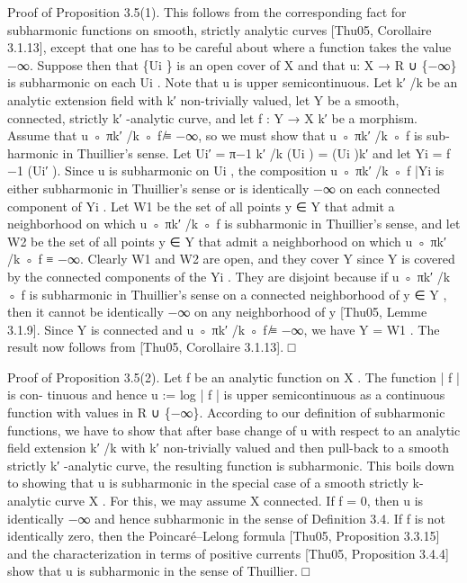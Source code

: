 \documentclass[
  10pt,
]{article}
\newenvironment{Shaded}{}{}
\newcommand{\NormalTok}[1]{#1}
\begin{document}
\begin{Shaded}
\begin{Highlighting}[]
\NormalTok{Proof of Proposition 3.5(1). This follows from the corresponding fact for subharmonic}
\NormalTok{functions on smooth, strictly analytic curves [Thu05, Corollaire 3.1.13], except that one}
\NormalTok{has to be careful about where a function takes the value −∞. Suppose then that \{Ui \}}
\NormalTok{is an open cover of X and that u: X → R ∪ \{−∞\} is subharmonic on each Ui . Note that}
\NormalTok{u is upper semicontinuous. Let k′ /k be an analytic extension field with k′ non{-}trivially}
\NormalTok{valued, let Y be a smooth, connected, strictly k′ {-}analytic curve, and let f : Y → X k′ be a}
\NormalTok{morphism. Assume that u ◦ πk′ /k ◦ f ̸≡ −∞, so we must show that u ◦ πk′ /k ◦ f is sub{-}}
\NormalTok{harmonic in Thuillier’s sense. Let Ui′ = π−1 k′ /k}
\NormalTok{                                                   (Ui ) = (Ui )k′ and let Yi = f −1 (Ui′ ). Since u}
\NormalTok{is subharmonic on Ui , the composition u ◦ πk′ /k ◦ f |Yi is either subharmonic in Thuillier’s}
\NormalTok{sense or is identically −∞ on each connected component of Yi .}
\NormalTok{   Let W1 be the set of all points y ∈ Y that admit a neighborhood on which u ◦ πk′ /k ◦ f}
\NormalTok{is subharmonic in Thuillier’s sense, and let W2 be the set of all points y ∈ Y that admit a}
\NormalTok{neighborhood on which u ◦ πk′ /k ◦ f ≡ −∞. Clearly W1 and W2 are open, and they cover}
\NormalTok{Y since Y is covered by the connected components of the Yi . They are disjoint because if}
\NormalTok{u ◦ πk′ /k ◦ f is subharmonic in Thuillier’s sense on a connected neighborhood of y ∈ Y ,}
\NormalTok{then it cannot be identically −∞ on any neighborhood of y [Thu05, Lemme 3.1.9].}
\NormalTok{Since Y is connected and u ◦ πk′ /k ◦ f ̸≡ −∞, we have Y = W1 . The result now follows}
\NormalTok{from [Thu05, Corollaire 3.1.13].                                                                  □}


\NormalTok{Proof of Proposition 3.5(2). Let f be an analytic function on X . The function | f | is con{-}}
\NormalTok{tinuous and hence u := log | f | is upper semicontinuous as a continuous function with}
\NormalTok{values in R ∪ \{−∞\}. According to our definition of subharmonic functions, we have to}
\NormalTok{show that after base change of u with respect to an analytic field extension k′ /k with k′}
\NormalTok{non{-}trivially valued and then pull{-}back to a smooth strictly k′ {-}analytic curve, the resulting}
\NormalTok{function is subharmonic. This boils down to showing that u is subharmonic in the special}
\NormalTok{case of a smooth strictly k{-}analytic curve X . For this, we may assume X connected. If}
\NormalTok{f = 0, then u is identically −∞ and hence subharmonic in the sense of Definition 3.4. If}
\NormalTok{f is not identically zero, then the Poincaré–Lelong formula [Thu05, Proposition 3.3.15]}
\NormalTok{and the characterization in terms of positive currents [Thu05, Proposition 3.4.4] show}
\NormalTok{that u is subharmonic in the sense of Thuillier.                                            □}



\end{Highlighting}
\end{Shaded}
\end{document}
